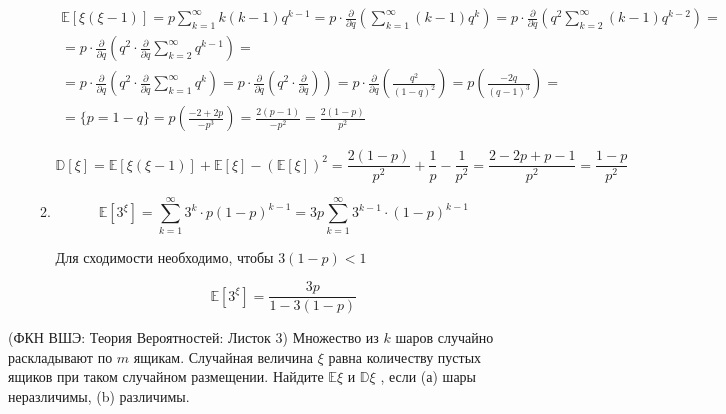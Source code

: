 \begin{solution}
\begin{enumerate}
\begin{enumerate}
		$$
		\begin{aligned} \mathbb{E}[\xi(\xi-1)] = p \sum_{k=1}^{\infty} k(k-1) q^{k-1}=p \cdot \frac{\partial}{\partial q}\left(\sum_{k=1}^{\infty}(k-1) q^{k}\right)=p \cdot \frac{\partial}{\partial q}\left(q^{2} \sum_{k=2}^{\infty}(k-1) q^{k-2}\right)=\\=p \cdot \frac{\partial}{\partial q}\left(q^{2} \cdot \frac{\partial}{\partial q} \sum_{k=2}^{\infty} q^{k-1}\right)=\\\left.=p \cdot \frac{\partial}{\partial q}\left(q^{2} \cdot \frac{\partial}{\partial q} \sum_{k=1}^{\infty} q^{k}\right)=p \cdot \frac{\partial}{\partial q}\left(q^{2} \cdot \frac{\partial}{\partial q}\right)\right)=p \cdot \frac{\partial}{\partial q}\left(\frac{q^{2}}{(1-q)^{2}}\right)=p\left(\frac{-2 q}{(q-1)^{3}}\right)=\\=\{p=1-q\}=p\left(\frac{-2+2 p}{-p^{3}}\right)=\frac{2(p-1)}{-p^{2}}=\frac{2(1-p)}{p^{2}} \end{aligned}
		$$
		
		$$\mathbb{D}[\xi]=\mathbb{E}[\xi(\xi-1)]+\mathbb{E}[\xi]-(\mathbb{E}[\xi])^{2}=\frac{2(1-p)}{p^{2}}+\frac{1}{p}-\frac{1}{p^{2}}=\frac{2-2 p+p-1}{p^{2}}=\frac{1-p}{p^{2}}
		$$
		
		\item 
	
		$$\mathbb{E}\left[3^{\xi}\right]=\sum_{k=1}^{\infty} 3^{k} \cdot p(1-p)^{k-1}=3 p \sum_{k=1}^{\infty} 3^{k-1} \cdot(1-p)^{k-1}$$
		
		Для сходимости необходимо, чтобы $3(1-p)<1$
		
		$$
		\mathbb{E}\left[3^{\xi}\right]=\frac{3 p}{1-3(1-p)}
		$$
	\end{enumerate}

	\end{enumerate}


\end{solution}


\begin{problem}(ФКН ВШЭ: Теория Вероятностей: Листок 3)
	Множество из $ k $ шаров случайно раскладывают по $ m $ ящикам. Случайная величина $ \xi $ равна количеству пустых ящиков при таком случайном размещении. Найдите $ \mathbb{E}\xi \text{ и }\mathbb{D}\xi$
	, если (а) шары неразличимы, (b) различимы.
\end{problem}

